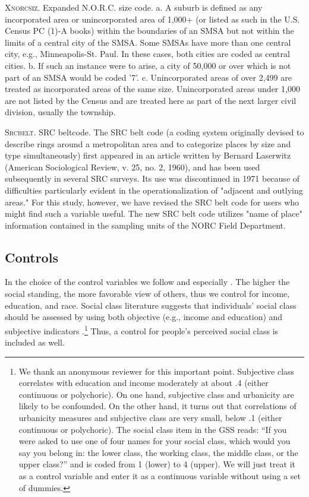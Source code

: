 \documentclass[11pt, letterpaper]{article}
\begin{document}
\begin{spacing}{1.4}
\textsc{Xnorcsiz}. Expanded N.O.R.C. size code. 
a. A suburb is defined as any incorporated area or unincorporated area
of 1,000+ (or listed as such in the U.S. Census PC (1)-A books) within
the boundaries of an SMSA but not within the limits of a central city
of the SMSA. Some SMSAs have more than one central city, e.g.,
Minneapolis-St. Paul. In these cases, both cities are coded as central
cities.
b. If such an instance were to arise, a city of 50,000 or over which is
not part of an SMSA would be coded '7'.
c. Unincorporated areas of over 2,499 are treated as incorporated areas
of the same size. Unincorporated areas under 1,000 are not listed by
the Census and are treated here as part of the next larger civil
division, usually the township.

\textsc{Srcbelt}. SRC beltcode. The SRC belt code (a coding system originally devised to describe
rings around a metropolitan area and to categorize places by size
and type simultaneously) first appeared in an article written by
Bernard Laserwitz (American Sociological Review, v. 25, no. 2, 1960),
and has been used subsequently in several SRC surveys.
Its use was discontinued in 1971 because of difficulties particularly
evident in the operationalization of "adjacent and outlying areas."
For this study, however, we have revised the SRC belt code for users
who might find such a variable useful. The new SRC belt code utilizes
"name of place" information contained in the sampling units
of the NORC Field Department.


\subsection*{Controls}

In the choice of the control variables we follow \citet{welch07} and especially \citet{smith97}.
The higher the social standing, the more favorable view of others, thus we control for income, education, and race. Social class literature suggests that individuals' social class should be assessed by using both objective (e.g., income and education) and subjective indicators \citep[e.g.,][]{kraus09}.\footnote{We thank an anonymous reviewer for this important point. Subjective class correlates with education and income moderately at about .4 (either continuous or polychoric). On one hand, subjective class and urbanicity are likely to be confounded. On the other hand, it turns out that correlations of urbanicity measures and subjective class are very small, below .1 (either continuous or polychoric). The social class item in the GSS reads: ``If you were asked to use one of four names for your social class, which would you say you belong in: the lower class, the working class, the middle class, or the upper class?'' and is coded from 1 (lower) to 4 (upper). We will just treat it as a control variable and enter it as a continuous variable without using a set of dummies.} Thus, a control for people's perceived social class is included as well. 


\end{spacing}
\end{document}

